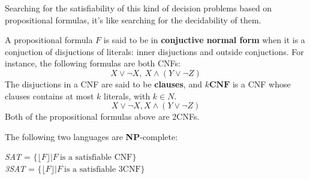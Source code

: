 Searching for the satisfiability of this kind of decision problems based on propositional formulas, it's like searching for the decidability of them. \vspace{7pt}

A propositional formula $F$ is said to be in \textbf{conjuctive normal form} when it is a conjuction of disjuctions of literals: inner disjuctions and outside 
conjuctions. For instance, the following formulas are both CNFs:
$$X \vee \neg X, \ X \wedge (Y \vee \neg Z)$$
The disjuctions in a CNF are said to be \textbf{clauses}, and $k \textbf{CNF}$ is a CNF whose clauses contains at most $k$ literals, with $k \in N$.
$$X \vee \neg X, X \wedge (Y \vee \neg Z)$$
Both of the propositional formulas above are 2CNFs.
\begin{definition}[title = Theorem]
    The following two languages are \textbf{NP}-complete: \vspace{3.5pt}
    \begin{center}
        \textit{SAT} = $\{\lfloor F \rfloor | F \ \text{is a satisfiable CNF}\}$ \\ 
        \textit{3SAT} = $\{\lfloor F \rfloor | F \ \text{is a satisfiable 3CNF}\}$
    \end{center}
\end{definition}